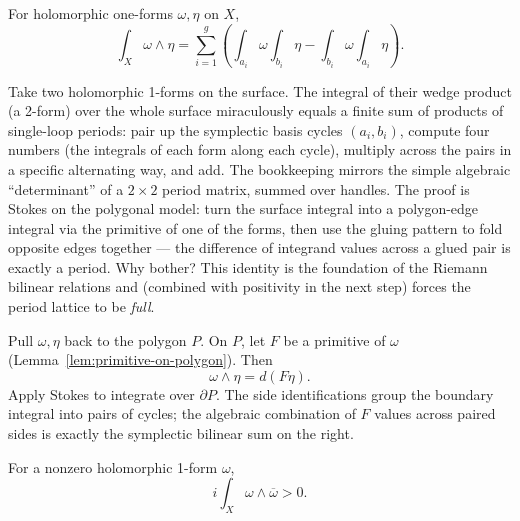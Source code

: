 \begin{theorem}
\label{thm:bilinear-from-stokes}
For holomorphic one-forms \(\omega,\eta\) on \(X\),
\[
  \int_X \omega\wedge\eta
  =
  \sum_{i=1}^{g}
  \left(
    \int_{a_i}\omega\int_{b_i}\eta
    -
    \int_{b_i}\omega\int_{a_i}\eta
  \right).
\]
\notready
\end{theorem}

\begin{layman}
Take two holomorphic 1-forms on the surface. The integral of their
wedge product (a 2-form) over the whole surface miraculously equals a
finite sum of products of single-loop periods: pair up the symplectic
basis cycles \((a_i, b_i)\), compute four numbers (the integrals of
each form along each cycle), multiply across the pairs in a specific
alternating way, and add. The bookkeeping mirrors the simple algebraic
``determinant'' of a \(2 \times 2\) period matrix, summed over handles.
The proof is Stokes on the polygonal model: turn the surface integral
into a polygon-edge integral via the primitive of one of the forms,
then use the gluing pattern to fold opposite edges together — the
difference of integrand values across a glued pair is exactly a
period. Why bother? This identity is the foundation of the Riemann
bilinear relations and (combined with positivity in the next step)
forces the period lattice to be \emph{full}.
\end{layman}

\begin{proofsketch}
Pull \(\omega,\eta\) back to the polygon \(P\). On \(P\), let \(F\) be a
primitive of \(\omega\) (Lemma~\ref{lem:primitive-on-polygon}). Then
\[
  \omega\wedge\eta = d(F\eta).
\]
Apply Stokes to integrate over \(\partial P\). The side identifications
group the boundary integral into pairs of cycles; the algebraic
combination of \(F\) values across paired sides is exactly the symplectic
bilinear sum on the right.
\end{proofsketch}

\begin{theorem}
\label{thm:hermitian-positivity}
For a nonzero holomorphic 1-form \(\omega\),
\[
  i\int_X \omega\wedge\overline{\omega} > 0.
\]
\notready
\end{theorem}

